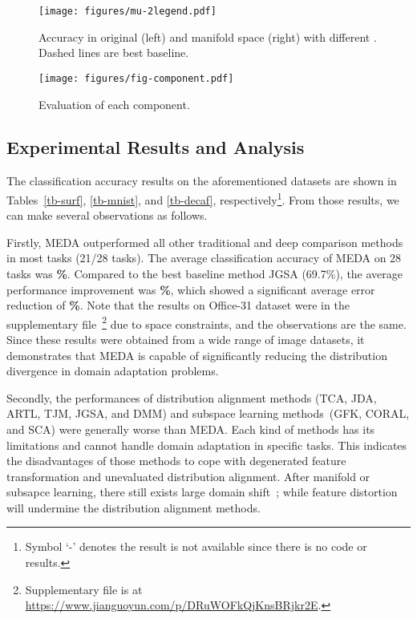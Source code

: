 \documentclass[sigconf]{acmart}
\begin{document}
\begin{figure}[t!]
	\centering
	\vspace{-.1in}
	\texttt{[image: figures/mu-2legend.pdf]}
	\vspace{-.1in}
	\caption{Accuracy in original (left) and manifold space (right) with different . Dashed lines are best baseline.}
	\label{fig-mu}
	\vspace{-.1in}
\end{figure}

\begin{figure}[t!]
	\centering
	\vspace{-.1in}
	\texttt{[image: figures/fig-component.pdf]}
	\vspace{-.15in}
	\caption{Evaluation of each component.}
	\label{fig-component}
	\vspace{-.15in}
\end{figure}

\subsection{Experimental Results and Analysis}
The classification accuracy results on the aforementioned datasets are shown in Tables~\ref{tb-surf}, \ref{tb-mnist}, and \ref{tb-decaf}, respectively\footnote{Symbol `-' denotes the result is not available since there is no code or results.}. From those results, we can make several observations as follows. 

Firstly, MEDA outperformed all other traditional and deep comparison methods in most tasks (21/28 tasks). The average classification accuracy of MEDA on 28 tasks was \textbf{\%}. Compared to the best baseline method JGSA (69.7\%), the average performance improvement was \textbf{\%}, which showed a significant average error reduction of \textbf{\%}. Note that the results on Office-31 dataset were in the supplementary file~\footnote{Supplementary file is at \url{https://www.jianguoyun.com/p/DRuWOFkQjKnsBRjkr2E}.} due to space constraints, and the observations are the same. Since these results were obtained from a wide range of image datasets, it demonstrates that MEDA is capable of significantly reducing the distribution divergence in domain adaptation problems. 

Secondly, the performances of distribution alignment methods (TCA, JDA, ARTL, TJM, JGSA, and DMM) and subspace learning methods~(GFK, CORAL, and SCA) were generally worse than MEDA. Each kind of methods has its limitations and cannot handle domain adaptation in specific tasks. This indicates the disadvantages of those methods to cope with degenerated feature transformation and unevaluated distribution alignment. After manifold or subsapce learning, there still exists large domain shift~\cite{baktashmotlagh2013unsupervised}; while feature distortion will undermine the distribution alignment methods. 
\end{document}
